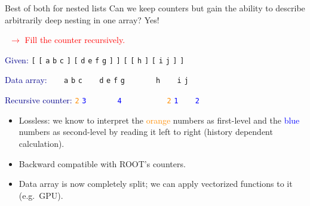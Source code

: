 \documentclass{beamer}
\begin{document}
\begin{frame}{Best of both for nested lists}
\vspace{0.5 cm}
Can we keep counters but gain the ability to describe arbitrarily deep nesting in one array? Yes!

\vspace{0.2 cm}
\textcolor{red}{\mbox{\hspace{1 cm} $\rightarrow$} Fill the counter recursively.}

\vspace{0.3 cm}
\textcolor{darkblue}{Given:} \hfill {\tt [} {\tt [} {\tt a} {\tt b} {\tt c} {\tt ]} {\tt [} {\tt d} {\tt e} {\tt f} {\tt g} {\tt ]} {\tt ]} {\tt [} {\tt [} {\tt h} {\tt ]} {\tt [} {\tt i} {\tt j} {\tt ]} {\tt ]}

\textcolor{darkblue}{Data array:} \hfill {\tt \ } {\tt \ } {\tt a} {\tt b} {\tt c} {\tt \ } {\tt \ } {\tt d} {\tt e} {\tt f} {\tt g} {\tt \ } {\tt \ } {\tt \ } {\tt \ } {\tt h} {\tt \ } {\tt \ } {\tt i} {\tt j} {\tt \ } {\tt \ }

\textcolor{darkblue}{Recursive counter:} \hfill \textcolor{darkorange}{\tt 2} \textcolor{blue}{\tt 3} {\tt \ } {\tt \ } {\tt \ } {\tt \ } \textcolor{blue}{\tt 4} {\tt \ } {\tt \ } {\tt \ } {\tt \ } {\tt \ } {\tt \ } \textcolor{darkorange}{\tt 2} \textcolor{blue}{\tt 1} {\tt \ } {\tt \ } \textcolor{blue}{\tt 2} {\tt \ } {\tt \ } {\tt \ } {\tt \ }

\vspace{0.3 cm}
\begin{itemize}
\item Lossless: we know to interpret the \textcolor{darkorange}{orange} numbers as first-level and the \textcolor{blue}{blue} numbers as second-level by reading it left to right (history dependent calculation).

\item Backward compatible with ROOT's counters.

\item Data array is now completely split; we can apply vectorized functions to it (e.g.\ GPU).
\end{itemize}
\end{frame}
\end{document}
